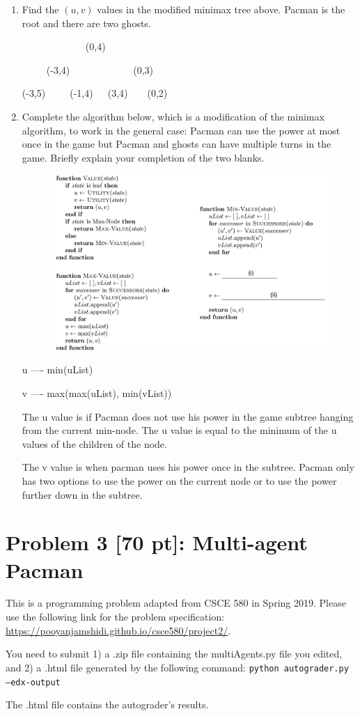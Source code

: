 \documentclass[12pt]{article}
\theoremstyle{case}
\begin{document}
    
\begin{enumerate} [label=(\alph*)]
    \item
    Find the $(u, v)$ values in the modified minimax tree above. Pacman is the root and there are two ghosts.
    
~~~~~~~~~~~~~(0,4)

~~~~~(-3,4)~~~~~~~~~~~~~(0,3)

(-3,5)~~~~~(-1,4)~~~(3,4)~~~~(0,2)

    
    \item Complete the algorithm below, which is a modification of the minimax algorithm, to work in the general case: Pacman can use the power at most once in the game but Pacman and ghosts can have multiple turns in the game. Briefly explain your completion of the two blanks.
    \begin{figure}[h]
    \includegraphics[width=1.\textwidth]{assignment3_3.jpg}
    \centering
    \end{figure}


u ---- min(uList)
 
v ---- max(max(uList), min(vList))

The u value is if Pacman does not use his power in the game subtree hanging from the current min-node. The u value is equal to the minimum of the u values of the children of the node.

The v value is when pacman uses his power once in the subtree. Pacman only has two options to use the power on the current node or to use the power further
down in the subtree.
  
\end{enumerate}


\newpage
\section*{Problem 3 [70 pt]: Multi-agent Pacman}
This is a programming problem adapted from CSCE 580 in Spring 2019.
Please use the following link for the problem specification:
\url{https://pooyanjamshidi.github.io/csce580/project2/}.

You need to submit 1) a .zip file containing the multiAgents.py file you edited, and 2) a .html file generated by the following command:
\texttt{python autograder.py --edx-output}

The .html file contains the autograder's results. 
\end{document}
